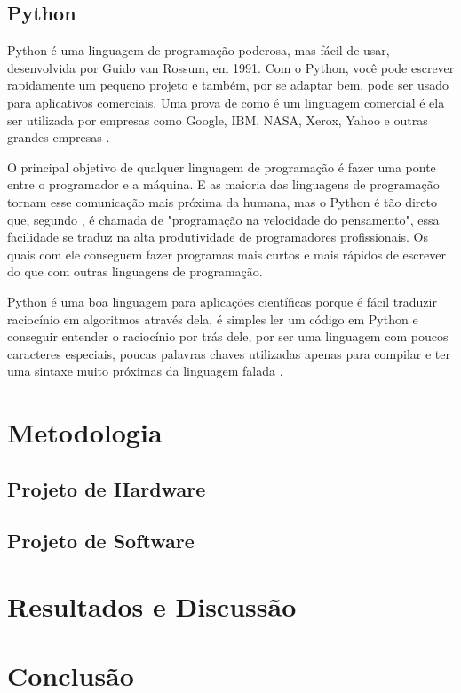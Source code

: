 \section{Python}

Python é uma linguagem de programação poderosa, mas fácil de usar, desenvolvida por Guido van Rossum, em 1991. Com o Python, você pode escrever rapidamente um pequeno projeto e também, por se adaptar bem, pode ser usado para aplicativos comerciais. Uma prova de como é um linguagem comercial é ela ser utilizada por empresas como Google, IBM, NASA, Xerox, Yahoo e outras grandes empresas \cite{dawson2010}.

O principal objetivo de qualquer linguagem de programação é fazer uma ponte entre o programador e a máquina. E as maioria das linguagens de programação tornam esse comunicação mais próxima da humana, mas o Python é tão direto que, segundo \cite{dawson2010}, é chamada de "programação na velocidade do pensamento", essa facilidade se traduz na alta produtividade de programadores profissionais. Os quais com ele conseguem fazer programas mais curtos e mais rápidos de escrever do que com outras linguagens de programação. 

Python é uma boa linguagem para aplicações científicas porque é fácil traduzir raciocínio em algoritmos através dela, é simples ler um código em Python e conseguir entender o raciocínio por trás dele, por ser uma linguagem com poucos caracteres especiais, poucas palavras chaves utilizadas apenas para compilar e ter uma sintaxe muito próximas da linguagem falada \cite{reitz2018}.

  





\chapter[Metodologia]{Metodologia}

\section{Projeto de Hardware}

\section {Projeto de Software}

\chapter{Resultados e Discussão}

\chapter{Conclusão}